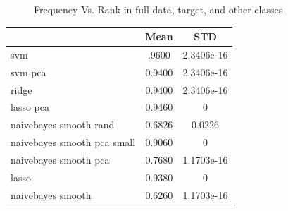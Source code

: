 \begin{center}
\begin{figure}[!ht]
\centering
{}
\caption{Frequency Vs. Rank in full data, target, and other classes}
\label{fig:largecompare}
\end{figure}
\end{center}


\begin{tabular}{lcc}
\hline
& Mean & STD \\
\hline
svm & .9600 & 2.3406e-16\\
svm pca & 0.9400 & 2.3406e-16\\
ridge & 0.9400 & 2.3406e-16\\
lasso pca & 0.9460 & 0 \\
naivebayes smooth rand & 0.6826 & 0.0226\\
naivebayes smooth pca small & 0.9060 & 0\\
naivebayes smooth pca & 0.7680 & 1.1703e-16\\
lasso & 0.9380 & 0\\
naivebayes smooth & 0.6260 & 1.1703e-16
\end{tabular}

